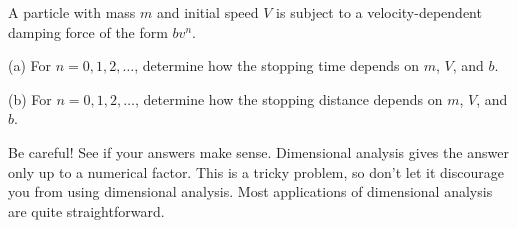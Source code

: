 A particle with mass $m$ and initial speed $V$ is subject to a velocity-dependent damping force of the form $bv^n$.

(a) For $n = 0, 1, 2, \dots$, determine how the stopping time depends on $m$, $V$, and $b$.

(b) For $n = 0, 1, 2, \dots$, determine how the stopping distance depends on $m$, $V$, and $b$.

Be careful! See if your answers make sense. Dimensional analysis gives the answer only up to a numerical factor. This is a tricky problem, so don't let it discourage you from using dimensional analysis. Most applications of dimensional analysis are quite straightforward.